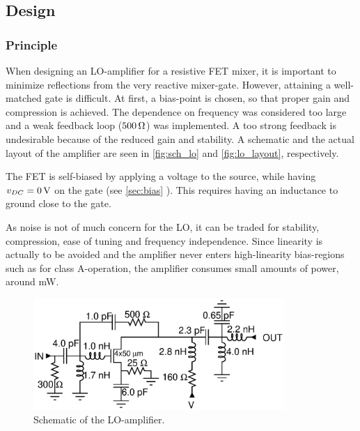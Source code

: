 		\subsection{Design}
			\subsubsection{Principle}
				When designing an LO-amplifier for a resistive FET mixer, it is important to minimize reflections from the very reactive mixer-gate. However, attaining a well-matched gate is difficult.\autocite{yhland1999} At first, a bias-point is chosen, so that proper gain and compression is achieved. The dependence on frequency was considered too large and a weak feedback loop ($\unit[500]{\Omega}$) was implemented. A too strong feedback is undesirable because of the reduced gain and stability. A schematic and the actual layout of the amplifier are seen in \autoref{fig:sch_lo} and \autoref{fig:lo_layout}, respectively.


	The FET is self-biased by applying a voltage to the source, while having $v_{DC}=\unit[0]{V}$ on the gate (see \ref{sec:bias} ). This requires having an inductance to ground close to the gate.


			As noise is not of much concern for the LO, it can be traded for stability, compression, ease of tuning and frequency independence. Since linearity is actually to be avoided and the amplifier never enters high-linearity bias-regions such as for class A-operation, the amplifier consumes small amounts of power, around \unit[100]{mW}.




			\begin{figure}[hbt!]
				\centering
				\includegraphics[width=0.85\textwidth]{fig/amplifiers/lo/sch_lo}
				\caption[LO-amplifier schematic]{Schematic of the LO-amplifier.}\label{fig:sch_lo}
			\end{figure}


